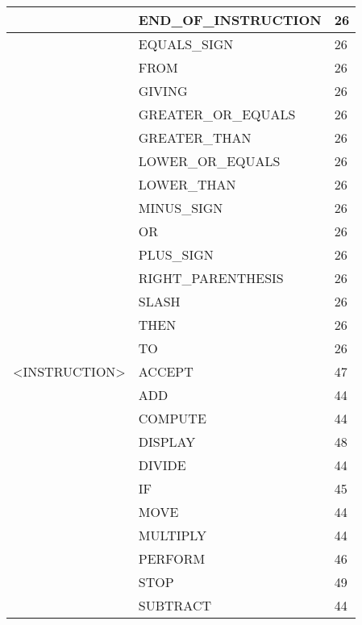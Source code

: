 \begin{longtable}{|l|l|l|}
                     &   END\_OF\_INSTRUCTION   &   26 \\ \hline
                     &   EQUALS\_SIGN          &   26 \\ \hline
                     &   FROM                 &   26 \\ \hline
                     &   GIVING               &   26 \\ \hline
                     &   GREATER\_OR\_EQUALS    &   26 \\ \hline
                     &   GREATER\_THAN         &   26 \\ \hline
                     &   LOWER\_OR\_EQUALS      &   26 \\ \hline
                     &   LOWER\_THAN           &   26 \\ \hline
                     &   MINUS\_SIGN           &   26 \\ \hline
                     &   OR                   &   26 \\ \hline
                     &   PLUS\_SIGN            &   26 \\ \hline
                     &   RIGHT\_PARENTHESIS    &   26 \\ \hline
                     &   SLASH                &   26 \\ \hline
                     &   THEN                 &   26 \\ \hline
                     &   TO                   &   26 \\ \hline
<INSTRUCTION>        &   ACCEPT               &   47 \\ \hline
                     &   ADD                  &   44 \\ \hline
                     &   COMPUTE              &   44 \\ \hline
                     &   DISPLAY              &   48 \\ \hline
                     &   DIVIDE               &   44 \\ \hline
                     &   IF                   &   45 \\ \hline
                     &   MOVE                 &   44 \\ \hline
                     &   MULTIPLY             &   44 \\ \hline
                     &   PERFORM              &   46 \\ \hline
                     &   STOP                 &   49 \\ \hline
                     &   SUBTRACT             &   44 \\ \hline

\end{longtable}
